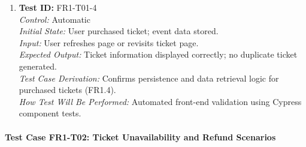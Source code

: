 \documentclass[12pt, titlepage]{article}
\begin{document}
\begin{enumerate}
    \item \textbf{Test ID:} FR1-T01-4\\[0.5em]
    \textit{Control:} Automatic\\[0.3em]
    \textit{Initial State:} User purchased ticket; event data stored.\\[0.3em]
    \textit{Input:} User refreshes page or revisits ticket page.\\[0.3em]
    \textit{Expected Output:} Ticket information displayed correctly; no duplicate ticket generated.\\[0.3em]
    \textit{Test Case Derivation:} Confirms persistence and data retrieval logic for purchased tickets (FR1.4).\\[0.3em]
    \textit{How Test Will Be Performed:} Automated front-end validation using Cypress component tests.
\end{enumerate}

\paragraph{Test Case FR1-T02: Ticket Unavailability and Refund Scenarios}
\end{document}
